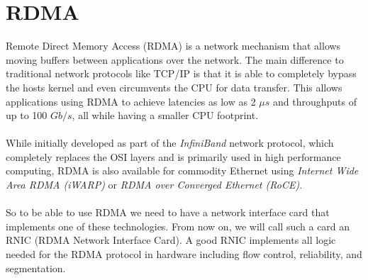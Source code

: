 \section{RDMA} \label{sec:rdma}

Remote Direct Memory Access (RDMA) is a network mechanism that allows moving buffers between applications over the network.
The main difference to traditional network protocols like TCP/IP is that it is able to completely bypass the hosts kernel
and even circumvents the CPU for data transfer. This allows applications using RDMA to achieve latencies as low as 2 $\mu s$
and throughputs of up to 100 $Gb/s$, all while having a smaller CPU footprint.


\paragraph{} While initially developed as part of the \emph{InfiniBand} network protocol, which completely replaces the OSI 
layers and is primarily used in high performance computing, RDMA is also available for commodity Ethernet using 
\emph{Internet Wide Area RDMA (iWARP)} or \emph{RDMA over Converged Ethernet (RoCE)}.


\paragraph{} So to be able to use RDMA we need to have a network interface card that implements one of these technologies. 
From now on, we will call such a card an RNIC (RDMA Network Interface Card). A good RNIC implements all logic needed for 
the RDMA protocol in hardware including flow control, reliability, and segmentation.


